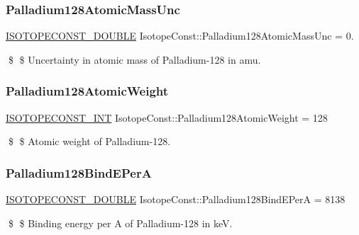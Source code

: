 \subsubsection{\texorpdfstring{Palladium128\+Atomic\+Mass\+Unc}{Palladium128AtomicMassUnc}}
{\footnotesize\ttfamily \mbox{\hyperlink{group___isotope_const-_macros_ga8f45a7272ce02c0b4c65c44636ed719a}{I\+S\+O\+T\+O\+P\+E\+C\+O\+N\+S\+T\+\_\+\+D\+O\+U\+B\+LE}} Isotope\+Const\+::\+Palladium128\+Atomic\+Mass\+Unc = 0.}

\$ \$ Uncertainty in atomic mass of Palladium-\/128 in amu. \mbox{\label{group___isotope_const-_palladium-_pd128_gac3ea36ba002d4bf9f1a0909575cd550a}} 
\subsubsection{\texorpdfstring{Palladium128\+Atomic\+Weight}{Palladium128AtomicWeight}}
{\footnotesize\ttfamily \mbox{\hyperlink{group___isotope_const-_macros_ga5f18360b3e99483a35c32d789e62621c}{I\+S\+O\+T\+O\+P\+E\+C\+O\+N\+S\+T\+\_\+\+I\+NT}} Isotope\+Const\+::\+Palladium128\+Atomic\+Weight = 128}

\$ \$ Atomic weight of Palladium-\/128. \mbox{\label{group___isotope_const-_palladium-_pd128_gaa66a9ac03edd99e9ba76a5877c4bf269}} 
\subsubsection{\texorpdfstring{Palladium128\+Bind\+E\+PerA}{Palladium128BindEPerA}}
{\footnotesize\ttfamily \mbox{\hyperlink{group___isotope_const-_macros_ga8f45a7272ce02c0b4c65c44636ed719a}{I\+S\+O\+T\+O\+P\+E\+C\+O\+N\+S\+T\+\_\+\+D\+O\+U\+B\+LE}} Isotope\+Const\+::\+Palladium128\+Bind\+E\+PerA = 8138}

\$ \$ Binding energy per A of Palladium-\/128 in keV. \mbox{\label{group___isotope_const-_palladium-_pd128_gae3d9a147fd1f8577a1347d1ae21dee7a}} 
